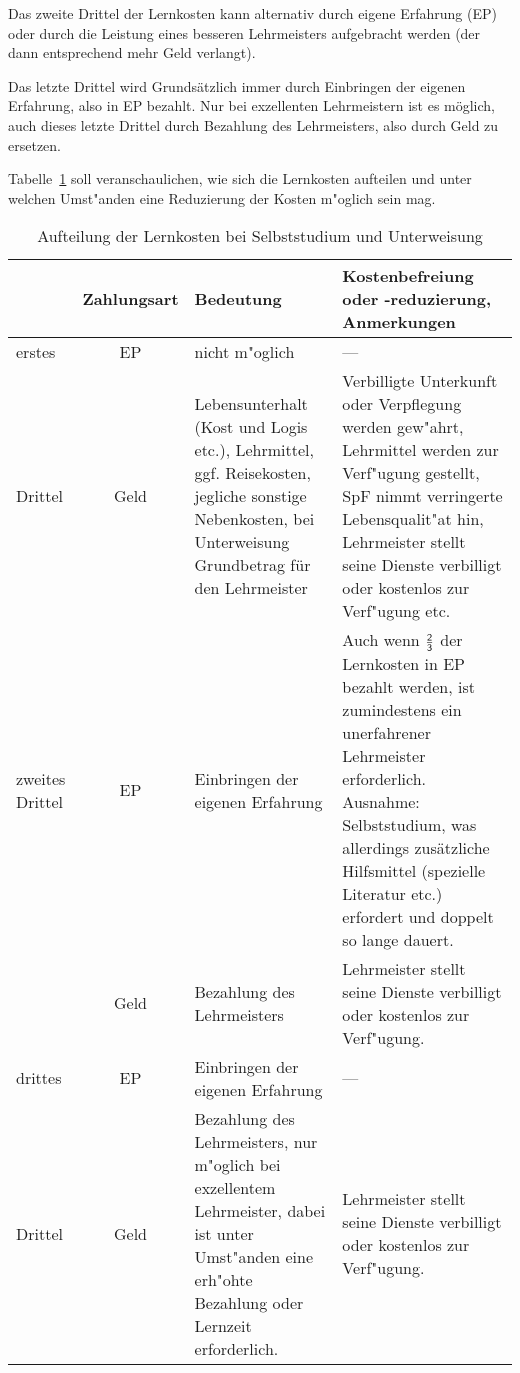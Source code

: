 \documentclass[10pt,a4paper,germanpar]{article}
\begin{document}
Das zweite Drittel der Lernkosten kann alternativ durch eigene
Erfahrung (EP) oder durch die Leistung eines besseren Lehrmeisters
aufgebracht werden (der dann entsprechend mehr Geld verlangt).

Das letzte Drittel wird Grundsätzlich immer durch Einbringen der
eigenen Erfahrung, also in EP bezahlt. Nur bei exzellenten
Lehrmeistern ist es möglich, auch dieses letzte Drittel durch
Bezahlung des Lehrmeisters, also durch Geld zu ersetzen.

Tabelle~\ref{tab:lernkosten} soll veranschaulichen, wie sich die Lernkosten
aufteilen und unter welchen Umst"anden eine Reduzierung der Kosten
m"oglich sein mag.

\begin{table}[htbp]
  \begin{center}

    {\footnotesize 
      \begin{tabular}{|p{1cm}|c|p{5cm}|p{7.5cm}|}
        \hline
        & \textbf{Zahlungsart}& \textbf{Bedeutung}
        & \textbf{Kostenbefreiung oder -reduzierung,
          Anmerkungen} \\
        \hline
        erstes& EP & nicht m"oglich& --- \\
        \cline{2-4}
        Drittel & Geld & Lebensunterhalt (Kost und Logis etc.), Lehrmittel,
        ggf. Reisekosten, jegliche sonstige Nebenkosten, bei
        Unterweisung Grundbetrag für den Lehrmeister & Verbilligte
        Unterkunft oder Verpflegung werden gew"ahrt, Lehrmittel werden zur
        Verf"ugung gestellt, SpF nimmt verringerte Lebensqualit"at hin,
        Lehrmeister stellt seine Dienste verbilligt
        oder kostenlos zur Verf"ugung etc.\\
        \hline
        zweites Drittel & EP & Einbringen der eigenen Erfahrung & Auch wenn
        $\frac{\sf 2}{\sf 3}$ der Lernkosten in EP bezahlt werden, ist zumindestens ein 
        unerfahrener Lehrmeister erforderlich. Ausnahme:
        Selbststudium, was allerdings zusätzliche Hilfsmittel (spezielle
        Literatur etc.)
        erfordert und doppelt so lange dauert.\\
        \cline{2-4}
        & Geld & Bezahlung des Lehrmeisters & Lehrmeister stellt seine Dienste verbilligt
        oder kostenlos zur Verf"ugung. \\
        \hline
        drittes & EP &  Einbringen der eigenen Erfahrung & ---\\
        \cline{2-4}
        Drittel & Geld & Bezahlung des Lehrmeisters, nur m"oglich bei
        exzellentem Lehrmeister, dabei ist unter Umst"anden eine erh"ohte
        Bezahlung oder Lernzeit erforderlich. & Lehrmeister stellt seine Dienste verbilligt
        oder kostenlos zur Verf"ugung. \\
        \hline
      \end{tabular}
      }

    \caption{Aufteilung der Lernkosten bei Selbststudium und Unterweisung}
    \label{tab:lernkosten}
  \end{center}
\end{table}
\end{document}
